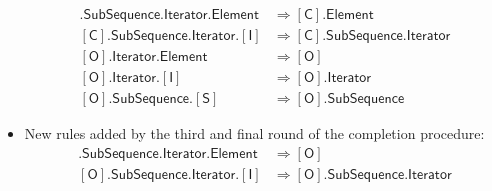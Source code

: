 \documentclass[headsepline,bibliography=totoc]{scrreport}
\newcommand{\namesym}[1]{\mathsf{#1}}
\newcommand{\proto}[1]{\bm{\mathsf{#1}}}
\newcommand{\protosym}[1]{[\proto{#1}]}
\theoremstyle{definition}
\theoremstyle{definition}
\theoremstyle{definition}
\begin{document}
\begin{listing}
\begin{itemize}
\begin{align}
\protosym{C}.\namesym{SubSequence}.\namesym{Iterator}.\namesym{Element}&\Rightarrow\protosym{C}.\namesym{Element}\tag{15}\\
\protosym{C}.\namesym{SubSequence}.\namesym{Iterator}.\protosym{I}&\Rightarrow\protosym{C}.\namesym{SubSequence}.\namesym{Iterator}\tag{16}\\
\protosym{O}.\namesym{Iterator}.\namesym{Element}&\Rightarrow\protosym{O}\tag{17}\\
\protosym{O}.\namesym{Iterator}.\protosym{I}&\Rightarrow\protosym{O}.\namesym{Iterator}\tag{18}\\
\protosym{O}.\namesym{SubSequence}.\protosym{S}&\Rightarrow\protosym{O}.\namesym{SubSequence}\tag{19}
\end{align}
\item New rules added by the third and final round of the completion procedure:
\begin{align}
\protosym{O}.\namesym{SubSequence}.\namesym{Iterator}.\namesym{Element}&\Rightarrow\protosym{O}\tag{20}\\
\protosym{O}.\namesym{SubSequence}.\namesym{Iterator}.\protosym{I}&\Rightarrow\protosym{O}.\namesym{SubSequence}.\namesym{Iterator}\tag{21}
\end{align}
\end{itemize}
\end{listing}
\end{document}
